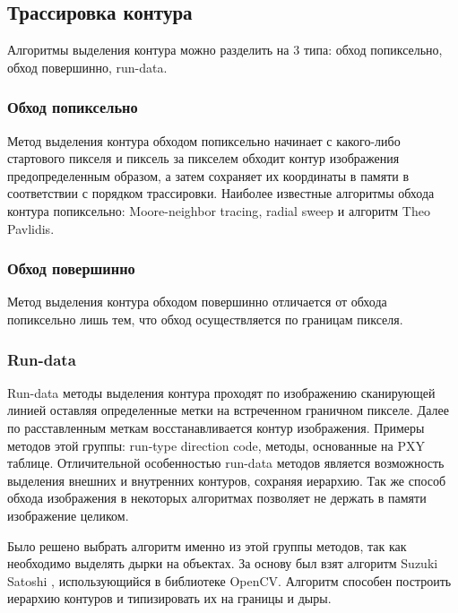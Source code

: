 \documentclass{fefu_thesis/cls/fefu}
\begin{document}
    \subsection{Трассировка контура}
    Алгоритмы выделения контура можно разделить на 3 типа: обход попиксельно, обход повершинно, run-data.
    \subsubsection{Обход попиксельно}
    Метод выделения контура обходом попиксельно начинает с какого-либо стартового пикселя и пиксель за пикселем обходит контур изображения предопределенным образом, а затем сохраняет их координаты в памяти в соответствии с порядком трассировки. Наиболее известные алгоритмы обхода контура попиксельно: Moore-neighbor tracing\cite{MoorNeighbor}, radial sweep\cite{RadialSweep} и алгоритм Theo Pavlidis\cite{TheoPavlidis}.
    \subsubsection{Обход повершинно}
    Метод выделения контура обходом повершинно отличается от обхода попиксельно лишь тем, что обход осуществляется по границам пикселя.
    \subsubsection{Run-data}
    Run-data методы выделения контура проходят по изображению сканирующей линией оставляя определенные метки на встреченном граничном пикселе. Далее по расставленным меткам восстанавливается контур изображения. Примеры методов этой группы: run-type direction code\cite{Miyatake1997}, методы, основанные на PXY таблице\cite{Shoji}. Отличительной особенностью run-data методов является возможность выделения внешних и внутренних контуров, сохраняя иерархию. Так же способ обхода изображения в некоторых алгоритмах позволяет не держать в памяти изображение целиком.

    Было решено выбрать алгоритм именно из этой группы методов, так как необходимо выделять дырки на объектах. За основу был взят алгоритм Suzuki Satoshi \cite{SuzukiAlgorithm}, использующийся в библиотеке OpenCV. Алгоритм способен построить иерархию контуров и типизировать их на границы и дыры.
\end{document}
